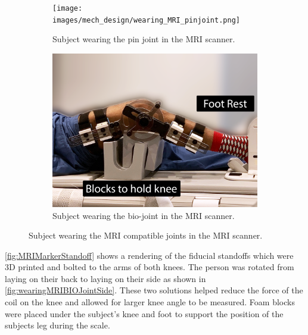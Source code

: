 \begin{figure}[ht!]
    \begin{subfigure}{\textwidth}
        \centering
        \captionsetup{justification=centering}
        \texttt{[image: images/mech\_design/wearing\_MRI\_pinjoint.png]}
        \caption[Pin Joint in MRI ]{Subject wearing the pin joint in the MRI scanner.}
        \label{fig:wearingMRIPINJoint}
    \end{subfigure}
    \begin{subfigure}{\textwidth}
        \centering
        \includegraphics[width=0.75\linewidth]{images/mech_design/wearing_MRI_bioknee.png}
          \captionsetup{justification=centering}
        \caption[Bio-joint in MRI]{Subject wearing the bio-joint in the MRI scanner.}
        \label{fig:wearingMRIBIOJoint}
    \end{subfigure}
    \caption[Subjects wearing MRI knee]{Subject wearing the MRI compatible joints in the MRI scanner.}
    \label{fig:wearingMRIKnees}
\end{figure}

\autoref{fig:MRIMarkerStandoff} shows a rendering of the fiducial standoffs which were 3D printed and bolted to the arms of both knees. The person was rotated from laying on their back to laying on their side as shown in \autoref{fig:wearingMRIBIOJointSide}. These two solutions helped reduce the force of the coil on the knee and allowed for larger knee angle to be measured. Foam blocks were placed under the subject's knee and foot to support the position of the subjects leg during the scale. 


